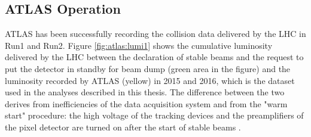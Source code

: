 \subsection{ATLAS Operation}

ATLAS has been successfully recording the collision data delivered by the LHC in Run1 and Run2. Figure \ref{fig:atlas:lumi1} shows the cumulative luminosity delivered by the LHC between the declaration of stable beams and the request to put the detector in standby for beam dump (green area in the figure) and the luminosity recorded by ATLAS (yellow) in 2015 and 2016, which is the dataset used in the analyses described in this thesis. The difference between the two derives from inefficiencies of the data acquisition system and from the "warm start" procedure: the high voltage of the tracking devices and the preamplifiers of the pixel detector are turned on after the start of stable beams \cite{LumiTwiki}.

